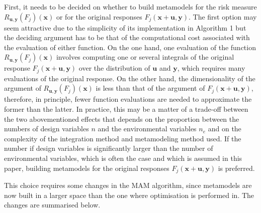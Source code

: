 \documentclass[10pt,twocolumn,a4paper]{article}
\begin{document}
First, it needs to be decided on whether to build metamodels for the risk measure $R_{\pmb u,\pmb y}(F_j)(\pmb x)$ or for the original responses $F_j (\pmb x+ \pmb u,\pmb y)$. The first option may seem attractive due to the simplicity of its implementation in Algorithm 1 but the deciding argument has to be that of the computational cost associated with the evaluation of either function. On the one hand, one evaluation of the function $R_{\pmb u,\pmb y}(F_j)(\pmb x)$ involves computing one or several integrals of the original response $F_j(\pmb x+ \pmb u,\pmb y)$ over the distribution of $\pmb u$ and $\pmb y$, which requires many evaluations of the original response. On the other hand, the dimensionality of the argument of $R_{\pmb u,\pmb y}(F_j)(\pmb x)$ is less than that of the argument of $F_j(\pmb x+ \pmb u,\pmb y)$, therefore, in principle, fewer function evaluations are needed to approximate the former than the latter. In practice, this may be a matter of a trade-off between the two abovementioned effects that depends on the proportion between the numbers of design variables $n$ and the environmental variables $n_e$ and on the complexity of the integration method and metamodeling method used. If the number if design variables is significantly larger than the number of environmental variables, which is often the case and which is assumed in this paper, building metamodels for the original responses $F_j(\pmb x+ \pmb u,\pmb y)$ is preferred.

This choice requires some changes in the MAM algorithm, since metamodels are now built in a larger space than the one where optimisation is performed in. The changes are summarised below.
\end{document}
